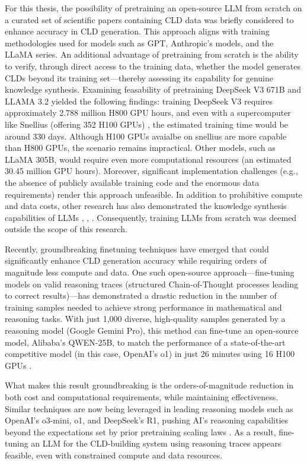 For this thesis, the possibility of pretraining an open-source LLM from scratch on a curated set of scientific papers containing CLD data was briefly considered to enhance accuracy in CLD generation. This approach aligns with training methodologies used for models such as GPT, Anthropic's models, and the LLaMA series. An additional advantage of pretraining from scratch is the ability to verify, through direct access to the training data, whether the model generates CLDs beyond its training set—thereby assessing its capability for genuine knowledge synthesis. Examining feasability of pretraining DeepSeek V3 671B and LLAMA 3.2 yielded the following findings:  training DeepSeek V3 requires approximately 2.788 million H800 GPU hours, and even with a supercomputer like Snellius (offering 352 H100 GPUs) \cite{snellius}, the estimated training time would be around 330 days. Although H100 GPUs avaialbe on snellius are more capable than H800 GPUs, the scenario remains impractical. Other models, such as LLaMA 305B, would require even more computational resources (an estimated 30.45 million GPU hours). Moreover, significant implementation challenges (e.g., the absence of publicly available training code and the enormous data requirements) render this approach unfeasible.
In addition to prohibitive compute and data costs, other research has also demonstrated the knowledge synthesis capabilities of LLMs \cite{Feng2023}, \cite{lu2024ai}, \cite{Wang2024}. Consequently, training LLMs from scratch was deemed outside the scope of this research.

Recently, groundbreaking finetuning techniques have emerged that could significantly enhance CLD generation accuracy while requiring orders of magnitude less compute and data. One such open-source approach—fine-tuning models on valid reasoning traces (structured Chain-of-Thought processes leading to correct results)—has demonstrated a drastic reduction in the number of training samples needed to achieve strong performance in mathematical and reasoning tasks. With just 1,000 diverse, high-quality samples generated by a reasoning model (Google Gemini Pro), this method can fine-tune an open-source model, Alibaba’s QWEN-25B, to match the performance of a state-of-the-art competitive model (in this case, OpenAI’s o1) in just 26 minutes using 16 H100 GPUs \cite{s1simpletesttimescaling}.

What makes this result groundbreaking is the orders-of-magnitude reduction in both cost and computational requirements, while maintaining effectiveness.  Similar techniques are now being leveraged in leading reasoning models such as OpenAI’s o3-mini, o1, and DeepSeek’s R1, pushing AI’s reasoning capabilities beyond the expectations set by prior pretraining scaling laws \cite{kaplan2020scaling}. As a result, fine-tuning an LLM for the CLD-building system using reasoning traces appears feasible, even with constrained compute and data resources.

